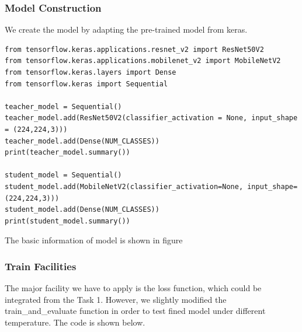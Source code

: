 \documentclass[conference]{IEEEtran}
\begin{document}
\subsubsection{Model Construction}

We create the model by adapting the pre-trained model from keras.

\begin{lstlisting}
from tensorflow.keras.applications.resnet_v2 import ResNet50V2
from tensorflow.keras.applications.mobilenet_v2 import MobileNetV2
from tensorflow.keras.layers import Dense
from tensorflow.keras import Sequential

teacher_model = Sequential()
teacher_model.add(ResNet50V2(classifier_activation = None, input_shape = (224,224,3)))
teacher_model.add(Dense(NUM_CLASSES))
print(teacher_model.summary())

student_model = Sequential()
student_model.add(MobileNetV2(classifier_activation=None, input_shape=(224,224,3)))
student_model.add(Dense(NUM_CLASSES))
print(student_model.summary())
\end{lstlisting}

The basic information of model is shown in figure %


\subsubsection{Train Facilities}

The major facility we have to apply is the loss function, which could be integrated from the Task 1. However, we slightly modified the train\_and\_evaluate function in order to test fined model under different temperature. The code is shown below.
\end{document}
